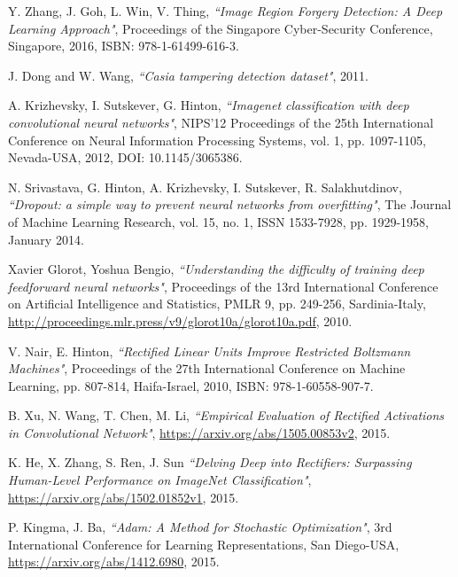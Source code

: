 Y. Zhang, J. Goh, L. Win, V. Thing,
\textit{``Image Region Forgery Detection: A Deep Learning Approach"},
Proceedings of the Singapore Cyber-Security Conference, Singapore, 2016, ISBN: 978-1-61499-616-3.


J. Dong and W. Wang,
\textit{``Casia tampering detection dataset"}, 2011.


A. Krizhevsky, I. Sutskever, G. Hinton,
\textit{``Imagenet classification with deep convolutional neural networks"},
NIPS'12 Proceedings of the 25th International Conference on Neural Information Processing Systems,
vol. 1, pp. 1097-1105, Nevada-USA, 2012, DOI: 10.1145/3065386.

N. Srivastava, 	G. Hinton, A. Krizhevsky, I. Sutskever, R. Salakhutdinov,
\textit{``Dropout: a simple way to prevent neural networks from overfitting"},
The Journal of Machine Learning Research,
vol. 15, no. 1, ISSN 1533-7928, pp. 1929-1958, January 2014.

Xavier Glorot, Yoshua Bengio,
\textit{``Understanding the difficulty of training deep feedforward neural networks"},
Proceedings of the 13rd International Conference on Artificial Intelligence and Statistics,
PMLR 9, pp. 249-256, Sardinia-Italy, \url{http://proceedings.mlr.press/v9/glorot10a/glorot10a.pdf}, 2010.

V. Nair, E. Hinton,
\textit{``Rectified Linear Units Improve Restricted Boltzmann Machines"},
Proceedings of the 27th International Conference on Machine Learning,
pp. 807-814, Haifa-Israel, 2010, ISBN: 978-1-60558-907-7.

B. Xu, N. Wang, T. Chen, M. Li,
\textit{``Empirical Evaluation of Rectified Activations in Convolutional Network"},
\url{https://arxiv.org/abs/1505.00853v2}, 2015.

K. He, X. Zhang, S. Ren, J. Sun
\textit{``Delving Deep into Rectifiers: Surpassing Human-Level Performance on ImageNet Classification"},
\url{https://arxiv.org/abs/1502.01852v1}, 2015.

P. Kingma, J. Ba,
\textit{``Adam: A Method for Stochastic Optimization"},
3rd International Conference for Learning Representations, San Diego-USA,
\url{https://arxiv.org/abs/1412.6980}, 2015.


